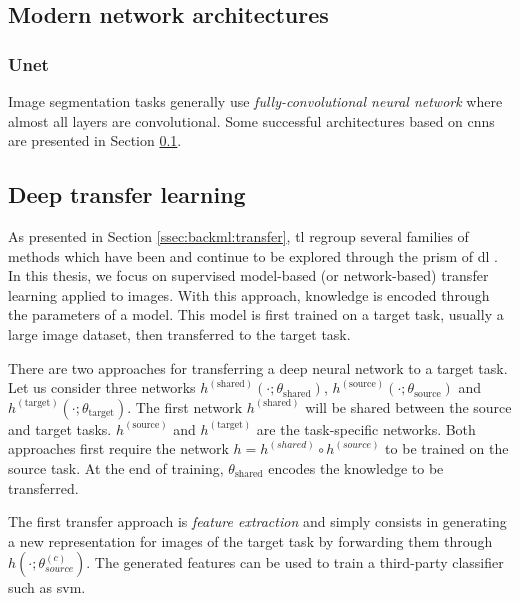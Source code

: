 

\subsection{Modern network architectures}
\label{ssec:backml:dl:modernarchi}

\subsubsection{Unet}

Image segmentation tasks generally use \textit{fully-convolutional neural network} where almost all layers are convolutional. Some successful architectures based on \acrshort{cnn}s are presented in Section \ref{ssec:backml:dl:modernarchi}. 


\subsection{Deep transfer learning}
\label{ssec:backml:dl:deeptransfer}

As presented in Section \ref{ssec:backml:transfer}, \acrlong{tl} regroup several families of methods which have been and continue to be explored through the prism of \acrlong{dl} \parencite{tan2018survey}. In this thesis, we focus on supervised model-based (or network-based) transfer learning applied to images. With this approach, knowledge is encoded through the parameters of a model. This model is first trained on a target task, usually a large image dataset, then transferred to the target task.

There are two approaches for transferring a deep neural network to a target task. Let us consider three networks $h^{(\text{shared})}(\cdot;\theta_{\text{shared}})$, $h^{(\text{source})}(\cdot;\theta_{\text{source}})$ and $h^{(\text{target})}(\cdot;\theta_{\text{target}})$. The first network $h^{(\text{shared})}$ will be shared between the source and target tasks. $h^{(\text{source})}$ and $h^{(\text{target})}$ are the task-specific networks. Both approaches first require the network $h = h^{(shared)} \circ h^{(source)}$ to be trained on the source task. At the end of training, $\theta_{\text{shared}}$ encodes the knowledge to be transferred. 

The first transfer approach is \textit{feature extraction} and simply consists in generating a new representation for images of the target task by forwarding them through $h(\cdot;\theta^{(c)}_{source})$. The generated features can be used to train a third-party classifier such as \acrshort{svm}.

